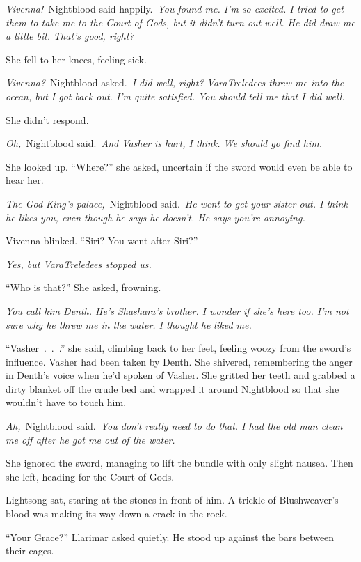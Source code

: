 \textit{Vivenna!}~Nightblood said happily.~\textit{You found me. I’m so excited. I tried to get them to take me to the Court of Gods, but it didn’t turn out well. He did draw me a little bit. That’s good, right?}

She fell to her knees, feeling sick.

\textit{Vivenna?}~Nightblood asked.~\textit{I did well, right? VaraTreledees threw me into the ocean, but I got back out. I’m quite satisfied. You should tell me that I did well.}

She didn’t respond.

\textit{Oh,}~Nightblood said.~\textit{And Vasher is hurt, I think. We should go find him.}

She looked up. “Where?” she asked, uncertain if the sword would even be able to hear her.

\textit{The God King’s palace,}~Nightblood said.~\textit{He went to get your sister out. I think he likes you, even though he says he doesn’t. He says you’re annoying.}

Vivenna blinked. “Siri? You went after Siri?”

\textit{Yes, but VaraTreledees stopped us.}

“Who is that?” She asked, frowning.

\textit{You call him Denth. He’s Shashara’s brother. I wonder if she’s here too. I’m not sure why he threw me in the water. I thought he liked me.}

“Vasher~.~.~.” she said, climbing back to her feet, feeling woozy from the sword’s influence. Vasher had been taken by Denth. She shivered, remembering the anger in Denth’s voice when he’d spoken of Vasher. She gritted her teeth and grabbed a dirty blanket off the crude bed and wrapped it around Nightblood so that she wouldn’t have to touch him.

\textit{Ah,}~Nightblood said.~\textit{You don’t really need to do that. I had the old man clean me off after he got me out of the water.}

She ignored the sword, managing to lift the bundle with only slight nausea. Then she left, heading for the Court of Gods.

\orn

Lightsong sat, staring at the stones in front of him. A trickle of Blushweaver’s blood was making its way down a crack in the rock.

“Your Grace?” Llarimar asked quietly. He stood up against the bars between their cages.

